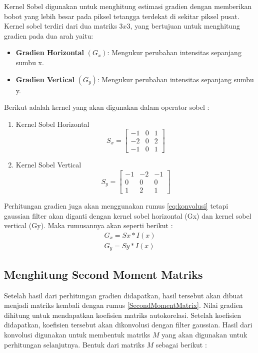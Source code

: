     Kernel Sobel digunakan untuk menghitung estimasi gradien dengan memberikan bobot yang lebih besar pada piksel tetangga terdekat di sekitar piksel pusat.
Kernel sobel terdiri dari dua matriks \(3 x 3\), yang bertujuan untuk menghitung gradien pada dua arah yaitu:
 \begin{itemize}
    \item \textbf{Gradien Horizontal} \((G_{x})\): Mengukur perubahan intensitas sepanjang sumbu x.
    \item \textbf{Gradien Vertical} \((G_{y})\): Mengukur perubahan intensitas sepanjang sumbu y.
\end{itemize}
    Berikut adalah kernel yang akan digunakan dalam operator sobel :
\begin{enumerate}
    \item Kernel Sobel Horizontal
    \begin{equation*}
        S_{x} = 
        \begin{bmatrix}
            -1 & 0 & 1 \\
            -2 & 0 & 2 \\
            -1 & 0 & 1
          \end{bmatrix}
    \end{equation*}

    \item  Kernel Sobel Vertical
    \begin{equation*}
        S_{y} = 
        \begin{bmatrix}
            -1 & -2 & -1 \\
            0 & 0 & 0 \\
            1 & 2 & 1
          \end{bmatrix}
    \end{equation*}

\end{enumerate}
Perhitungan gradien juga akan menggunakan rumus \eqref{eq:konvolusi} tetapi gaussian filter akan diganti dengan kernel sobel horizontal (Gx) dan kernel sobel vertical (Gy).
Maka rumusannya akan seperti berikut :
\begin{equation}
    \begin{aligned}
        G_{x} = Sx * I(x)\\ G_{y} = Sy * I(x)
    \end{aligned}
\end{equation}


\subsection{Menghitung Second Moment Matriks}
    Setelah hasil dari perhitungan gradien didapatkan, hasil tersebut akan dibuat menjadi matriks kembali dengan rumus \eqref{SecondMomentMatrix}. Nilai gradien dihitung untuk mendapatkan koefisien matriks autokorelasi. Setelah koefisien didapatkan, koefisien tersebut akan dikonvolusi dengan filter gaussian.
Hasil dari konvolusi digunakan untuk membentuk matriks \(M\) yang akan digunakan untuk perhitungan selanjutnya. Bentuk dari matriks \(M\) sebagai berikut :

